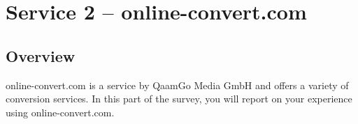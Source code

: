 \section{Service 2 – online-convert.com}
\subsection{Overview}
online-convert.com is a service by QaamGo Media GmbH and offers a variety of conversion services. In this part of the survey, you will report on your experience using online-convert.com. 


\clearpage

\clearpage

\clearpage
